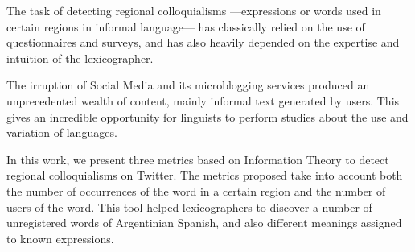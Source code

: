 The task of detecting regional colloquialisms —expressions or words used in certain regions in informal language— has classically relied on the use of questionnaires and surveys, and has also heavily depended on the expertise and intuition of the lexicographer.

The irruption of Social Media and its microblogging services produced an unprecedented wealth of content, mainly informal text generated by users. This gives an incredible opportunity for linguists to perform studies about the use and variation of languages.

In this work, we present three metrics based on Information Theory to detect regional colloquialisms on Twitter. The metrics proposed take into account both the number of occurrences of the word in a certain region and the number of users of the word. This tool helped lexicographers to discover a number of unregistered words of Argentinian Spanish, and also different meanings assigned to known expressions.
